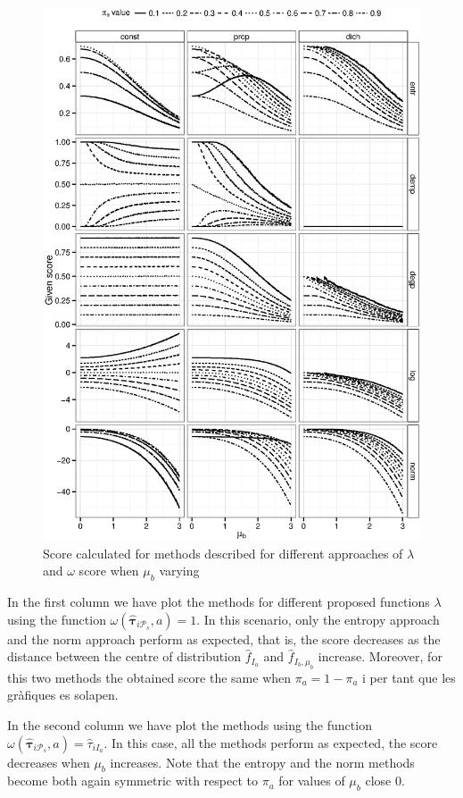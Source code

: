\documentclass[10pt, a4paper]{article}
\newcommand{\m}[1]{\boldsymbol{#1}}
\begin{document}
\begin{spacing}{1.9}
\begin{figure}[!t]
\centering
\includegraphics[scale=.5]{fig01all.eps}
\caption{Score calculated for methods described for different approaches of $\lambda$ and $\omega$ score when $\mu_b$ varying}
\label{fig:mu_varying}
\end{figure}

In the first column we have plot the methods for different proposed functions $\lambda$ using the function $\omega(\hat{\m \tau}_{i \mathcal{P}_s}, a) = 1$. In this scenario, only the entropy approach and the norm approach perform as expected, that is, the score decreases as the distance between the centre of distribution $\hat{f}_{I_a}$ and $\hat{f}_{I_b, \mu_b}$ increase. Moreover, for this two methods the obtained score the same when $\pi_a = 1- \pi_a$ {\color{blue} i per tant que les gr\`{a}fiques es solapen}.

In the second column we have plot the methods using the function $\omega(\hat{\m \tau}_{i \mathcal{P}_s}, a) = \hat{\tau}_{iI_a}$. In this case, all the methods perform as expected, the score decreases when $\mu_b$ increases. Note that the entropy and the norm methods become both again symmetric with respect to $\pi_a$ for values of $\mu_b$ close $0$.


\end{spacing}
\end{document}

